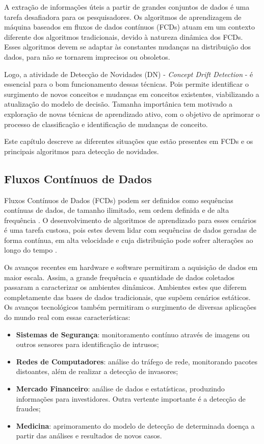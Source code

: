 \documentclass[qual, classic, a4paper]{ufbathesis}
\begin{document}
A extração de informações úteis a partir de grandes conjuntos de dados é uma tarefa desafiadora para os pesquisadores.
Os algoritmos de aprendizagem de máquina baseados em fluxos de dados contínuos (FCDs) atuam em um contexto diferente dos algoritmos tradicionais, 
devido à natureza dinâmica dos FCDs.
Esses algoritmos devem se adaptar às constantes mudanças na distribuição dos dados, para não se tornarem imprecisos ou obsoletos.

Logo, a atividade de Detecção de Novidades (DN) - \textit{Concept Drift Detection} - é essencial para o bom funcionamento dessas técnicas. Pois permite identificar o surgimento de novos conceitos e mudanças em conceitos existentes, viabilizando a atualização do modelo de decisão. Tamanha importânica tem motivado a exploração de novas técnicas de aprendizado ativo, com o objetivo de aprimorar o processo de classificação e identificação de mudanças de conceito. 

Este capítulo descreve as diferentes situações que estão presentes em FCDs e os principais algoritmos para detecção de novidades.

\subsection{Fluxos Contínuos de Dados}

Fluxos Contínuos de Dados (FCDs) podem ser definidos como sequências contínuas de dados, de tamanho ilimitado, sem ordem definida e de alta frequência \cite{Babcock:2002:MID:543613.543615}. O desenvolvimento de algoritmos de aprendizado para esses cenários é uma tarefa custosa, pois estes devem lidar com sequências de dados geradas de forma contínua, em alta velocidade e cuja distribuição pode sofrer alterações ao longo do tempo \cite{Gama:2014:survey}. 

Os avanços recentes em hardware e software permitiram a aquisição de dados em maior escala. Assim, a grande frequência e quantidade de dados coletados passaram a caracterizar os ambientes dinâmicos.  Ambientes estes que diferem completamente das bases de dados tradicionais, que supõem cenários estáticos. Os avanços tecnológicos também permitiram o surgimento de diversas aplicações do mundo real com essas características: 

\begin{itemize}
    \item \textbf{Sistemas de Segurança}: monitoramento contínuo através de imagens ou outros sensores para identificação de intrusos;

    \item \textbf{Redes de Computadores}: análise do tráfego de rede, monitorando pacotes distoantes, além de realizar a detecção de invasores;

    \item \textbf{Mercado Financeiro}: análise de dados e estatísticas, produzindo informações para investidores. Outra vertente importante é a detecção de fraudes;

    \item \textbf{Medicina}: aprimoramento do modelo de detecção de determinada doença a partir das análises e resultados de novos casos.
\end{itemize}
\end{document}
